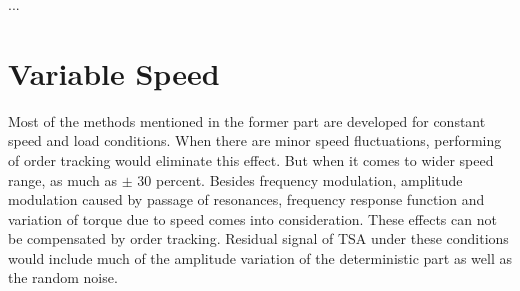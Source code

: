 ...

\section{Variable Speed}

Most of the methods mentioned in the former part are developed for constant speed and load conditions. When there are minor speed fluctuations, performing of order tracking would eliminate this effect. But when it comes to wider speed range, as much as $\pm$ 30 percent. Besides frequency modulation, amplitude modulation caused by passage of resonances, frequency response function and variation of torque due to speed comes into consideration. These effects can not be compensated by order tracking. Residual signal of TSA under these conditions would include much of the amplitude variation of the deterministic part as well as the random noise. \cite{varyspeed}














